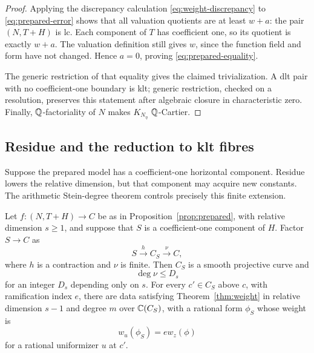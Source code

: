 \begin{proof}
Applying the discrepancy calculation
\eqref{eq:weight-discrepancy} to \eqref{eq:prepared-error} shows that
all valuation quotients are at least $w+a$: the pair $(N,T+H)$ is lc.
Each component of $T$ has coefficient one, so its quotient is exactly
$w+a$.  The valuation definition still gives $w$, since the function
field and form have not changed.  Hence $a=0$, proving
\eqref{eq:prepared-equality}.

The generic restriction of that equality gives the claimed
trivialization.  A dlt pair with no coefficient-one boundary is klt;
generic restriction, checked on a resolution, preserves this statement
after algebraic closure in characteristic zero.  Finally,
$\mathbb Q$-factoriality of $N$ makes $K_{N_\eta}$ $\mathbb Q$-Cartier.
\end{proof}

\subsection{Residue and the reduction to klt fibres}

Suppose the prepared model has a coefficient-one horizontal component.
Residue lowers the relative dimension, but that component may acquire
new constants.  The arithmetic Stein-degree theorem controls precisely
this finite extension.

\begin{lemma}\label{lem:residue-reduction}
Let $f:(N,T+H)\to C$ be as in Proposition~\ref{prop:prepared}, with
relative dimension $s\ge1$, and suppose that $S$ is a coefficient-one
component of $H$.  Factor $S\to C$ as
\[
                    S\xrightarrow{h}C_S\xrightarrow{\nu}C,
\]
where $h$ is a contraction and $\nu$ is finite.  Then $C_S$ is a
smooth projective curve and
\[
                              \deg\nu\le D_s
\]
for an integer $D_s$ depending only on $s$.  For every $c'\in C_S$
above $c$, with ramification index $e$, there are data satisfying
Theorem~\ref{thm:weight} in relative dimension $s-1$ and degree $m$
over $\mathbb C(C_S)$, with a rational form $\phi_S$ whose weight is
\begin{equation}\label{eq:residue-weight}
                             w_u(\phi_S)=e w_z(\phi)
\end{equation}
for a rational uniformizer $u$ at $c'$.
\end{lemma}

